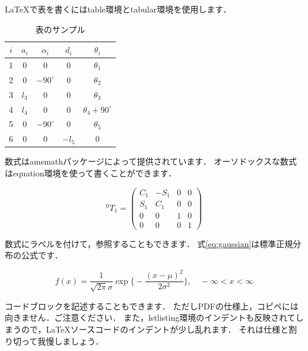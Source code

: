 \documentclass[uplatex, a4paper]{jsarticle}
\begin{document}
  \LaTeX で表を書くには\textsf{table}環境と\textsf{tabular}環境を使用します．

  \begin{table}[h]
    \begin{center}
      \caption{表のサンプル}
      \begin{tabular}{|c||c|c|c|c|} \hline
        $i$ & $a_{i}$ & $\alpha_{i}$  & $d_{i}$  & $\theta_{i}$             \\ \hline \hline
         1  &    0    &       0       &    0     & $\theta_{1}$             \\ \hline
         2  &    0    & $-90^{\circ}$ &    0     & $\theta_{2}$             \\ \hline
         3  & $l_{3}$ &       0       &    0     & $\theta_{3}$             \\ \hline
         4  & $l_{4}$ &       0       &    0     & $\theta_{4}+90^{\circ}$  \\ \hline
         5  &    0    & $-90^{\circ}$ &    0     & $\theta_{5}$             \\ \hline
         6  &    0    &       0       & $-l_{5}$ &    0                     \\ \hline
      \end{tabular}
      \label{tab:dhparameter}
    \end{center}
  \end{table}

  数式は\textsf{amsmath}パッケージによって提供されています．
  オーソドックスな数式は\textsf{equation}環境を使って書くことができます．

  \begin{equation}
  {}^0\!T_{1}=\begin{pmatrix} C_{1} & -S_{1} & 0 & 0 \\ S_{1} & C_1 & 0 & 0 \\ 0 & 0 & 1 & 0 \\ 0 & 0 & 0 & 1 \end{pmatrix}
  \end{equation}

  数式にラベルを付けて，参照することもできます．
  式\ref{eq:gaussian}は標準正規分布の公式です．

  \begin{equation}
    f(x)=\dfrac {1}{\sqrt{2\pi}\sigma}\exp\biggl\{ -\dfrac {(x-\mu)^2}{2\sigma^2}\biggr\}, \quad -\infty<x<\infty
    \label{eq:gaussian}
  \end{equation}

  コードブロックを記述することもできます．
  ただしPDFの仕様上，コピペには向きません．ご注意ください．
  また，\textsf{lstlisting}環境のインデントも反映されてしまうので，\LaTeX ソースコードのインデントが少し乱れます．
  それは仕様と割り切って我慢しましょう．
\end{document}
